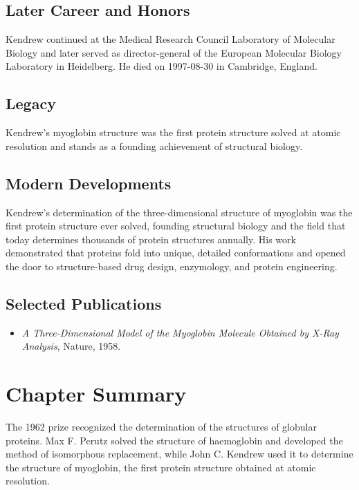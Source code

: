 \subsection*{Later Career and Honors}

Kendrew continued at the Medical Research Council Laboratory of Molecular Biology and later served as director-general of the European Molecular Biology Laboratory in Heidelberg. He died on 1997-08-30 in Cambridge, England.

\subsection*{Legacy}

Kendrew's myoglobin structure was the first protein structure solved at atomic resolution and stands as a founding achievement of structural biology.

\subsection*{Modern Developments}

Kendrew's determination of the three-dimensional structure of myoglobin was the first protein structure ever solved, founding structural biology and the field that today determines thousands of protein structures annually. His work demonstrated that proteins fold into unique, detailed conformations and opened the door to structure-based drug design, enzymology, and protein engineering.

\subsection*{Selected Publications}

\begin{itemize}

\item \emph{A Three-Dimensional Model of the Myoglobin Molecule Obtained by X-Ray Analysis}, Nature, 1958.

\end{itemize}

\clearpage

\section*{Chapter Summary}

The 1962 prize recognized the determination of the structures of globular proteins. Max F. Perutz solved the structure of haemoglobin and developed the method of isomorphous replacement, while John C. Kendrew used it to determine the structure of myoglobin, the first protein structure obtained at atomic resolution.

